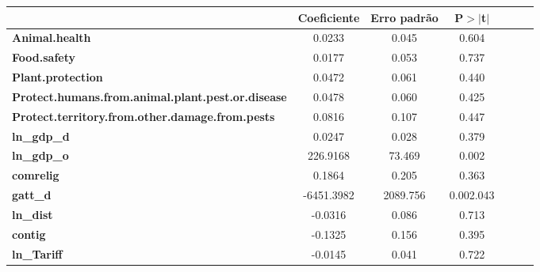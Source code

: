 \begin{center}
\begin{tabular}{lcccccc}
                                                          & \textbf{Coeficiente} & \textbf{Erro padrão} &\textbf{P$> |$t$|$}\\
\midrule
\textbf{Animal.health}                                    &       0.0233  &        0.045     &        0.604     \\
\textbf{Food.safety}                                      &       0.0177  &        0.053     &        0.737     \\
\textbf{Plant.protection}                                 &       0.0472  &        0.061     &        0.440     \\
\textbf{Protect.humans.from.animal.plant.pest.or.disease} &       0.0478  &        0.060     &        0.425     \\
\textbf{Protect.territory.from.other.damage.from.pests}   &       0.0816  &        0.107     &        0.447     \\
\textbf{ln\_gdp\_d}                                       &       0.0247  &        0.028     &        0.379     \\
\textbf{ln\_gdp\_o}                                       &     226.9168  &       73.469     &        0.002     \\
\textbf{comrelig}                                         &       0.1864  &        0.205     &        0.363     \\
\textbf{gatt\_d}                                          &   -6451.3982  &     2089.756     &        0.002.043 \\
\textbf{ln\_dist}                                         &      -0.0316  &        0.086     &        0.713     \\
\textbf{contig}                                           &      -0.1325  &        0.156     &        0.395     \\
\textbf{ln\_Tariff}                                       &      -0.0145  &        0.041     &        0.722     \\
\bottomrule
\end{tabular}
\end{center}